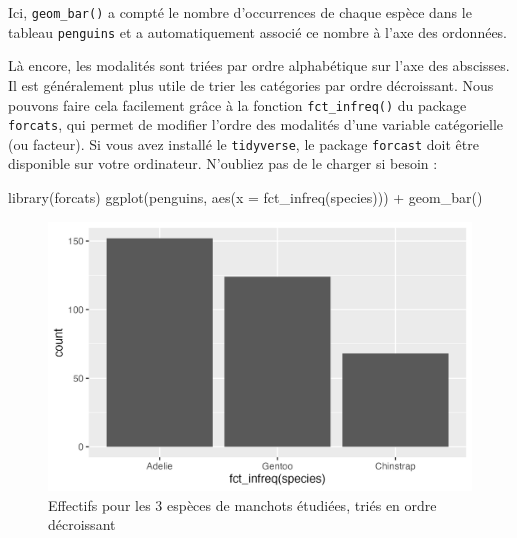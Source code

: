 \documentclass[
  letterpaper,
  DIV=11,
  numbers=noendperiod]{scrreprt}
\newenvironment{Shaded}{\begin{snugshade}}{\end{snugshade}}
\newcommand{\AttributeTok}[1]{\textcolor[rgb]{0.40,0.45,0.13}{#1}}
\newcommand{\FunctionTok}[1]{\textcolor[rgb]{0.28,0.35,0.67}{#1}}
\newcommand{\NormalTok}[1]{\textcolor[rgb]{0.00,0.23,0.31}{#1}}
\newcommand{\SpecialCharTok}[1]{\textcolor[rgb]{0.37,0.37,0.37}{#1}}
\begin{document}
Ici, \texttt{geom\_bar()} a compté le nombre d'occurrences de chaque
espèce dans le tableau \texttt{penguins} et a automatiquement associé ce
nombre à l'axe des ordonnées.

Là encore, les modalités sont triées par ordre alphabétique sur l'axe
des abscisses. Il est généralement plus utile de trier les catégories
par ordre décroissant. Nous pouvons faire cela facilement grâce à la
fonction \texttt{fct\_infreq()} du package \texttt{forcats}, qui permet
de modifier l'ordre des modalités d'une variable catégorielle (ou
facteur). Si vous avez installé le \texttt{tidyverse}, le package
\texttt{forcast} doit être disponible sur votre ordinateur. N'oubliez
pas de le charger si besoin :

\begin{Shaded}
\begin{Highlighting}[]
\FunctionTok{library}\NormalTok{(forcats)}
\FunctionTok{ggplot}\NormalTok{(penguins, }\FunctionTok{aes}\NormalTok{(}\AttributeTok{x =} \FunctionTok{fct\_infreq}\NormalTok{(species))) }\SpecialCharTok{+}
  \FunctionTok{geom\_bar}\NormalTok{()}
\end{Highlighting}
\end{Shaded}

\begin{figure}[H]

{\centering \includegraphics{./03-visualization_files/figure-pdf/fig-bpspecies-infreq-1.png}

}

\caption{\label{fig-bpspecies-infreq}Effectifs pour les 3 espèces de
manchots étudiées, triés en ordre décroissant}

\end{figure}
\end{document}
